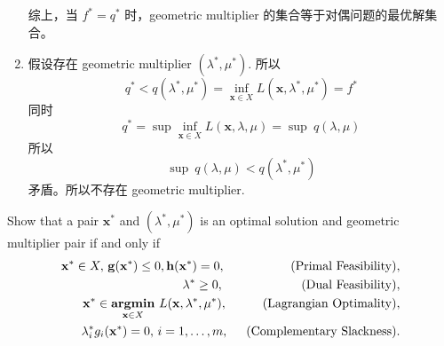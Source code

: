\documentclass[11pt,letter,notitlepage]{article}
\DeclareMathOperator*{\argmin}{\bf argmin}
\begin{document}
\begin{solution}
\begin{enumerate}
		      综上，当 $f^*=q^*$ 时，geometric multiplier 的集合等于对偶问题的最优解集合。
		\item 假设存在 geometric multiplier $(\lambda^*,\mu^*)$.
		      所以
		      $$q^* <q(\lambda^*,\mu^*)=\inf_{\mathbf{x}\in X} L(\mathbf{x},\lambda^*,\mu^*)=f^*$$
		      同时
		      $$q^*=\sup \inf_{\mathbf{x}\in X} L(\mathbf{x},\lambda,\mu)
			      =\sup\ q(\lambda,\mu)$$
		      所以
		      $$\sup\ q(\lambda,\mu) < q(\lambda^*,\mu^*)$$
		      矛盾。所以不存在 geometric multiplier.
	\end{enumerate}
\end{solution}


\newpage
\begin{exercise}
	Show that a pair $\mathbf{x}^*$ and $(\lambda^*,\mu^*)$ is an optimal solution and geometric multiplier pair if and only if
	\begin{align}\label{cond:primal-feasibility}
		\mathbf{x}^*\in X,\,\mathbf{g}(\mathbf{x}^*)\leq0,\mathbf{h}(\mathbf{x}^*)=0,\hspace{18.5mm}(\mbox{\textup{Primal Feasibility}}), & \\ \label{cond:dual-feasibility}
		\lambda^*\geq0,\hspace{22mm}(\mbox{\textup{Dual Feasibility}}),                                                                   & \\ \label{cond:lagrangian-optimality}
		\mathbf{x}^*\in\argmin_{\mathbf{x}\in X}\,L(\mathbf{x},\lambda^*,\mu^*),\hspace{10mm}(\mbox{\textup{Lagrangian Optimality}}),     & \\ \label{cond:complementary-slackness}
		\lambda^*_ig_i(\mathbf{x}^*)=0,\,i=1,\ldots,m,\hspace{5mm}(\mbox{\textup{Complementary Slackness}}).                              &
	\end{align}
\end{exercise}
\end{document}
